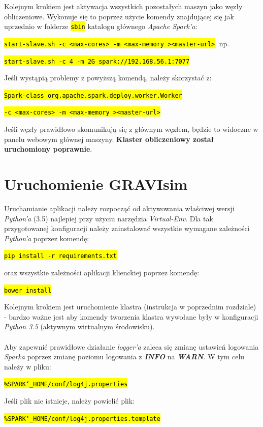 \documentclass[a4paper,onecolumn,oneside,12pt]{memoir}
\begin{document}
{{Kolejnym krokiem jest aktywacja wszystkich pozostałych maszyn jako węzły obliczeniowe. Wykonuje się to poprzez użycie komendy znajdującej się jak uprzednio w folderze \texttt{\hl{sbin}} katalogu głównego \textit{Apache Spark'a}: \\ \vspace{2mm}
\centerline{\texttt{\hl{start-slave.sh -c <max-cores> -m <max-memory ><master-url>}}, np.}
\centerline{\texttt{\hl{start-slave.sh -c 4 -m 2G spark://192.168.56.1:7077}}}
Jeśli wystąpią problemy z powyższą komendą, należy skorzystać z:\\
\centerline{\texttt{\hl{Spark-class org.apache.spark.deploy.worker.Worker }}}
\centerline{\texttt{\hl{-c <max-cores> -m <max-memory ><master-url>}}}
Jeśli węzły prawidłowo skomunikują się z głównym węzłem, będzie to widoczne
w panelu webowym głównej maszyny. \textbf{Klaster obliczeniowy został uruchomiony poprawnie}.
\pagebreak
\vspace*{1mm}
\section{Uruchomienie GRAVIsim}
Uruchamianie aplikacji należy rozpocząć od aktywowania właściwej wersji \textit{Python'a} (3.5)
najlepiej przy użyciu narzędzia \textit{Virtual-Env}. Dla tak przygotowanej konfiguracji
należy zainstalować wszystkie wymagane zależności \textit{Python'a} poprzez komendę:\vspace{2mm}
\centerline{\texttt{\hl{pip install -r requirements.txt}}}\vspace{2mm}
oraz wszystkie zależności aplikacji klienckiej poprzez komendę:\\\vspace{2mm}
\centerline{\texttt{\hl{bower install}}}\vspace{2mm}

Kolejnym krokiem jest uruchomienie klastra (instrukcja w poprzednim rozdziale) - bardzo ważne jest aby komendy
tworzenia klastra wywołane były w konfiguracji \textit{Python 3.5} (aktywnym wirtualnym
środowisku).
\\
\\
Aby zapewnić prawidłowe działanie \textit{logger’a} zaleca się zmianę ustawień logowania \textit{Sparka} poprzez zmianę poziomu logowania z \textit{\textbf{INFO}} na \textit{\textbf{WARN}}. W tym celu należy w pliku:\vspace{2mm}
 \centerline{\texttt{\hl{\%SPARK{\char`_}HOME/conf/log4j.properties}}}
\begin{framed}
Jeśli plik nie istnieje, należy powielić plik:\\ \vspace{2mm}
  \centerline{\texttt{\hl{\%SPARK{\char`_}HOME/conf/log4j.properties.template}}}


\end{framed}}}
\end{document}
